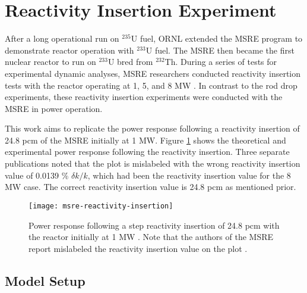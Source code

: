 \section{Reactivity Insertion Experiment} \label{sec:reactivity-insertion}

After a long operational run on $^{235}$U fuel, \gls{ORNL} extended the \gls{MSRE} program to
demonstrate reactor operation with $^{233}$U fuel. The \gls{MSRE} then became the first nuclear
reactor to run on $^{233}$U bred from $^{232}$Th. During a series of tests for experimental
dynamic analyses, \gls{MSRE} researchers conducted reactivity insertion tests with the reactor
operating at 1, 5, and 8 MW \cite{steffy_experimental_1970}.
In contrast to the rod drop experiments, these reactivity insertion
experiments were conducted with the \gls{MSRE} in power operation.

This work aims to replicate the power response following a reactivity insertion of 24.8 pcm of the
\gls{MSRE} initially at 1 MW. Figure \ref{fig:msre-reactivity-insertion} shows the theoretical and
experimental power response following the reactivity insertion. Three separate publications
\cite{zanetti_innovative_2015, singh_study_2019, mochizuki_validation_2022} noted that the plot is
mislabeled with the wrong reactivity insertion value of 0.0139 \% $\delta k/k$, which had been the
reactivity insertion value for the 8 MW case. The correct reactivity insertion value is 24.8 pcm as
mentioned prior.

\begin{figure}[t]
  \centering
  \texttt{[image: msre-reactivity-insertion]}
  \caption{Power response following a step reactivity insertion of 24.8 pcm with the reactor
    initially at 1 MW \cite{steffy_experimental_1970}. Note that the authors of the \gls{MSRE}
    report mislabeled the reactivity insertion value on the plot
  \cite{zanetti_innovative_2015, singh_study_2019, mochizuki_validation_2022}.}
  \label{fig:msre-reactivity-insertion}
\end{figure}

\subsection{Model Setup}

